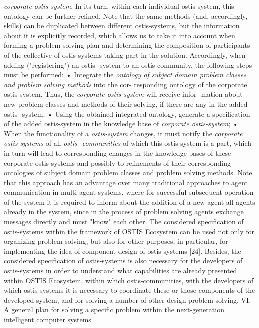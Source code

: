 \documentclass{article}
\begin{document}
\textit{corporate ostis-system}. In its turn, within each individual
ostis-system, this ontology can be further refined. Note
that the same methods (and, accordingly, skills) can
be duplicated between different ostis-systems, but the
information about it is explicitly recorded, which allows
us to take it into account when forming a problem solving
plan and determining the composition of participants of
the collective of ostis-systems taking part in the solution.
Accordingly, when adding ("registering") an ostis-
system to an ostis-community, the following steps must
be performed:
• Integrate the \textit{ontology of subject domain problem
classes and problem solving methods} into the cor-
responding ontology of the corporate ostis-system.
Thus, the \textit{corporate ostis-system} will receive infor-
mation about new problem classes and methods of
their solving, if there are any in the added ostis-
system;
• Using the obtained integrated ontology, generate
a specification of the added ostis-system in the
knowledge base of \textit{corporate ostis-system};
• When the functionality of a \textit{ostis-system} changes, it
must notify the \textit{corporate ostis-systems} of all \textit{ostis-
communities} of which this ostis-system is a part,
which in turn will lead to corresponding changes in
the knowledge bases of these corporate ostis-systems
and possibly to refinements of their corresponding
ontologies of subject domain problem classes and
problem solving methods. Note that this approach
has an advantage over many traditional approaches
to agent communication in multi-agent systems,
where for successful subsequent operation of the
system it is required to inform about the addition of
a new agent all agents already in the system, since
in the process of problem solving agents exchange
messages directly and must "know" each other.
The considered specification of ostis-systems within
the framework of OSTIS Ecosystem can be used not
only for organizing problem solving, but also for other
purposes, in particular, for implementing the idea of
component design of ostis-systems [24]. Besides, the
considered specification of ostis-systems is also necessary
for the developers of ostis-systems in order to understand
what capabilities are already presented within OSTIS
Ecosystem, within which ostis-communities, with the
developers of which ostis-systems it is necessary to
coordinate these or those components of the developed
system, and for solving a number of other design problem
solving.
VI. A general plan for solving a specific problem
within the next-generation intelligent computer systems
\end{document}
